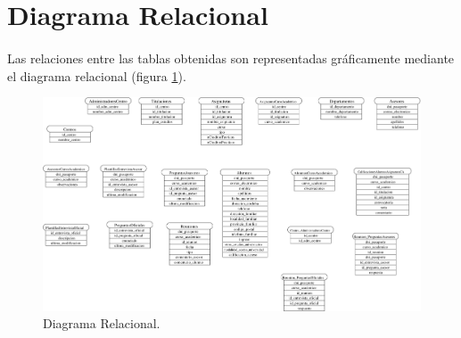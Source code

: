\section{Diagrama Relacional}

  \paragraph{}Las relaciones entre las tablas obtenidas son representadas
  gráficamente mediante el diagrama relacional (figura
  \ref{diagramaRelacional}).

  \begin{figure}[!ht]
            \begin{center}
            \includegraphics[]{10.Disenyo_Datos/10.5.Diagrama_Relacional/diagramaRelacional.pdf}
            \caption{Diagrama Relacional.}
            \label{diagramaRelacional}
            \end{center}
         \end{figure}
